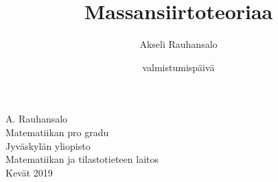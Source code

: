 
\title{Massansiirtoteoriaa}
\author{Akseli Rauhansalo}
\date{valmistumispäivä}


\thispagestyle{empty}                   %
\begin{center}                          %
\null\vspace{3cm}                       %
\Large                                  %
\large                                  %
A. Rauhansalo\\[1cm]                    %
\vfill                                  %
\normalsize                             %
Matematiikan pro gradu\\[1cm]           %
Jyväskylän yliopisto\\                  %
Matematiikan ja tilastotieteen laitos\\ %
Kevät 2019                              %
\end{center}                            %
%
%
%
%
%
%
%
